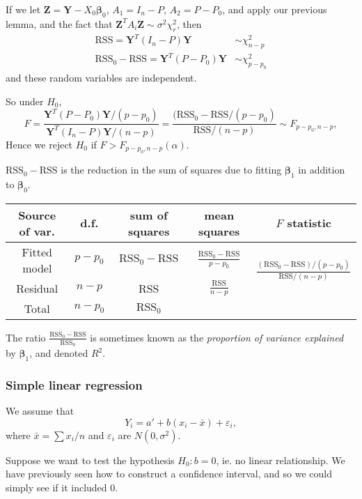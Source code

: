 \documentclass[a4paper]{article}
\begin{document}
If we let $\mathbf{Z} = \mathbf{Y} - X_0 \boldsymbol\beta_0$, $A_1 = I_n - P$, $A_2 = P - P_0$, and apply our previous lemma, and the fact that $\mathbf{Z}^TA_i \mathbf{Z} \sim \sigma^2 \chi_r^2$, then
\begin{align*}
  \mathrm{RSS} = \mathbf{Y}^T(I_n - P)\mathbf{Y} &\sim \chi_{n - p}^2\\
  \mathrm{RSS}_0 - \mathrm{RSS} = \mathbf{Y}^T(P - P_0)\mathbf{Y} &\sim \chi^2_{p - p_0}
\end{align*}
and these random variables are independent.

So under $H_0$,
\[
  F = \frac{\mathbf{Y}^T(P - P_0)\mathbf{Y}/(p - p_0)}{\mathbf{Y}^T(I_n - P)\mathbf{Y}/(n - p)} = \frac{(\mathrm{RSS}_0 - \mathrm{RSS}/(p - p_0)}{\mathrm{RSS}/(n - p)} \sim F_{p - p_0, n - p},
\]
Hence we reject $H_0$ if $F > F_{p - p_0, n - p}(\alpha)$.

$\mathrm{RSS}_0 - \mathrm{RSS}$ is the reduction in the sum of squares due to fitting $\boldsymbol\beta_1$ in addition to $\boldsymbol\beta_0$.

\noindent\begin{tabular}{ccccc}
  \toprule
  Source of var. & d.f. & sum of squares & mean squares & $F$ statistic\\
  \midrule
  Fitted model & $p - p_0$ & $\mathrm{RSS}_0 - \mathrm{RSS}$ & $\frac{\mathrm{RSS}_0 - \mathrm{RSS}}{p - p_0}$ & \multirow{2}{*}{$\frac{(\mathrm{RSS}_0 - \mathrm{RSS})/(p - p_0)}{\mathrm{RSS}/(n - p)}$}\\
  Residual & $n - p$ & RSS & $\frac{\mathrm{RSS}}{n - p}$\\
  \midrule
  Total & $n - p_0$ & $\mathrm{RSS}_0$\\
  \bottomrule
\end{tabular}

The ratio $\frac{\mathrm{RSS}_0 - \mathrm{RSS}}{\mathrm{RSS}_0}$ is sometimes known as the \emph{proportion of variance explained} by $\boldsymbol\beta_1$, and denoted $R^2$.

\subsubsection{Simple linear regression}
We assume that
\[
  Y_i = a' + b(x_i - \bar x) + \varepsilon_i,
\]
where $\bar x = \sum x_i/n$ and $\varepsilon_i$ are $N(0, \sigma^2)$.

Suppose we want to test the hypothesis $H_0: b = 0$, ie. no linear relationship. We have previously seen how to construct a confidence interval, and so we could simply see if it included 0.
\end{document}
